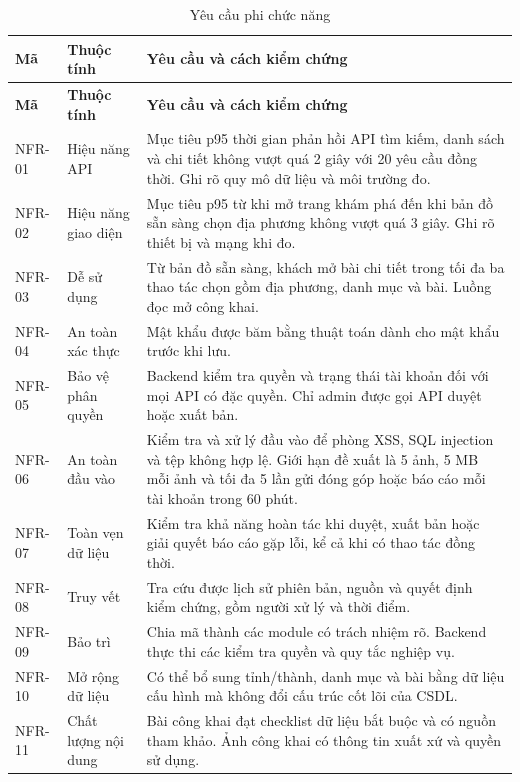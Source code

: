 \begin{longtable}{|L{18mm}|L{27mm}|L{94mm}|}
\caption{Yêu cầu phi chức năng}\label{tab:chapter3-nfr}\\\hline
{}\textbf{Mã} & \textbf{Thuộc tính} & \textbf{Yêu cầu và cách kiểm chứng}\\\hline
\endfirsthead
\hline
{}\textbf{Mã} & \textbf{Thuộc tính} & \textbf{Yêu cầu và cách kiểm chứng}\\\hline
\endhead
\endfoot
NFR-01 & Hiệu năng API & Mục tiêu p95 thời gian phản hồi API tìm kiếm, danh sách và chi tiết không vượt quá 2 giây với 20 yêu cầu đồng thời. Ghi rõ quy mô dữ liệu và môi trường đo.\\\hline
NFR-02 & Hiệu năng giao diện & Mục tiêu p95 từ khi mở trang khám phá đến khi bản đồ sẵn sàng chọn địa phương không vượt quá 3 giây. Ghi rõ thiết bị và mạng khi đo.\\\hline
NFR-03 & Dễ sử dụng & Từ bản đồ sẵn sàng, khách mở bài chi tiết trong tối đa ba thao tác chọn gồm địa phương, danh mục và bài. Luồng đọc mở công khai.\\\hline
NFR-04 & An toàn xác thực & Mật khẩu được băm bằng thuật toán dành cho mật khẩu trước khi lưu.\\\hline
NFR-05 & Bảo vệ phân quyền & Backend kiểm tra quyền và trạng thái tài khoản đối với mọi API có đặc quyền. Chỉ admin được gọi API duyệt hoặc xuất bản.\\\hline
NFR-06 & An toàn đầu vào & Kiểm tra và xử lý đầu vào để phòng XSS, SQL injection và tệp không hợp lệ. Giới hạn đề xuất là 5 ảnh, 5 MB mỗi ảnh và tối đa 5 lần gửi đóng góp hoặc báo cáo mỗi tài khoản trong 60 phút.\\\hline
NFR-07 & Toàn vẹn dữ liệu & Kiểm tra khả năng hoàn tác khi duyệt, xuất bản hoặc giải quyết báo cáo gặp lỗi, kể cả khi có thao tác đồng thời.\\\hline
NFR-08 & Truy vết & Tra cứu được lịch sử phiên bản, nguồn và quyết định kiểm chứng, gồm người xử lý và thời điểm.\\\hline
NFR-09 & Bảo trì & Chia mã thành các module có trách nhiệm rõ. Backend thực thi các kiểm tra quyền và quy tắc nghiệp vụ.\\\hline
NFR-10 & Mở rộng dữ liệu & Có thể bổ sung tỉnh/thành, danh mục và bài bằng dữ liệu cấu hình mà không đổi cấu trúc cốt lõi của CSDL.\\\hline
NFR-11 & Chất lượng nội dung & Bài công khai đạt checklist dữ liệu bắt buộc và có nguồn tham khảo. Ảnh công khai có thông tin xuất xứ và quyền sử dụng.\\\hline

\end{longtable}
